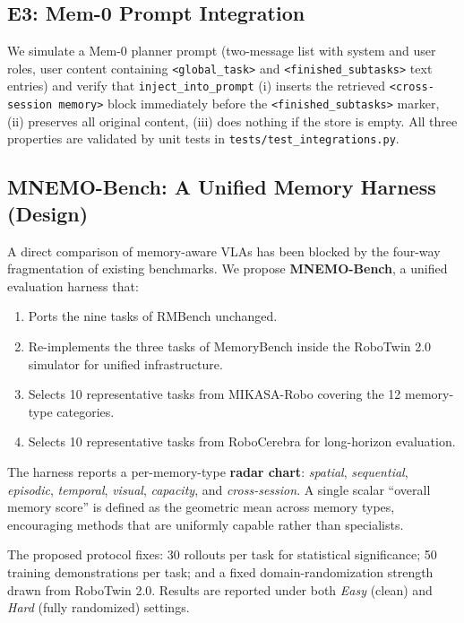\subsection{E3: Mem-0 Prompt Integration}
\label{sec:exp:integration}

We simulate a Mem-0 planner prompt (two-message list with system and
user roles, user content containing \texttt{<global\_task>} and
\texttt{<finished\_subtasks>} text entries) and verify that
\texttt{inject\_into\_prompt} (i) inserts the retrieved
\texttt{<cross-session memory>} block immediately before the
\texttt{<finished\_subtasks>} marker, (ii) preserves all original
content, (iii) does nothing if the store is empty. All three
properties are validated by unit tests in
\texttt{tests/test\_integrations.py}.

\subsection{MNEMO-Bench: A Unified Memory Harness (Design)}
\label{sec:exp:bench}

A direct comparison of memory-aware VLAs has been blocked by the
four-way fragmentation of existing benchmarks. We propose
\textbf{MNEMO-Bench}, a unified evaluation harness that:

\begin{enumerate}
\item Ports the nine tasks of RMBench \cite{rmbench} unchanged.
\item Re-implements the three tasks of MemoryBench \cite{sam2act}
      inside the RoboTwin 2.0 \cite{robotwin2} simulator for unified
      infrastructure.
\item Selects 10 representative tasks from MIKASA-Robo
      \cite{mikasa} covering the 12 memory-type categories.
\item Selects 10 representative tasks from RoboCerebra
      \cite{robocerebra} for long-horizon evaluation.
\end{enumerate}

The harness reports a per-memory-type \textbf{radar chart}:
\emph{spatial}, \emph{sequential}, \emph{episodic},
\emph{temporal}, \emph{visual}, \emph{capacity}, and
\emph{cross-session}. A single scalar ``overall memory score'' is
defined as the geometric mean across memory types, encouraging
methods that are uniformly capable rather than specialists.

The proposed protocol fixes: 30 rollouts per task for statistical
significance; 50 training demonstrations per task; and a fixed
domain-randomization strength drawn from RoboTwin 2.0. Results are
reported under both \textit{Easy} (clean) and \textit{Hard} (fully
randomized) settings.

